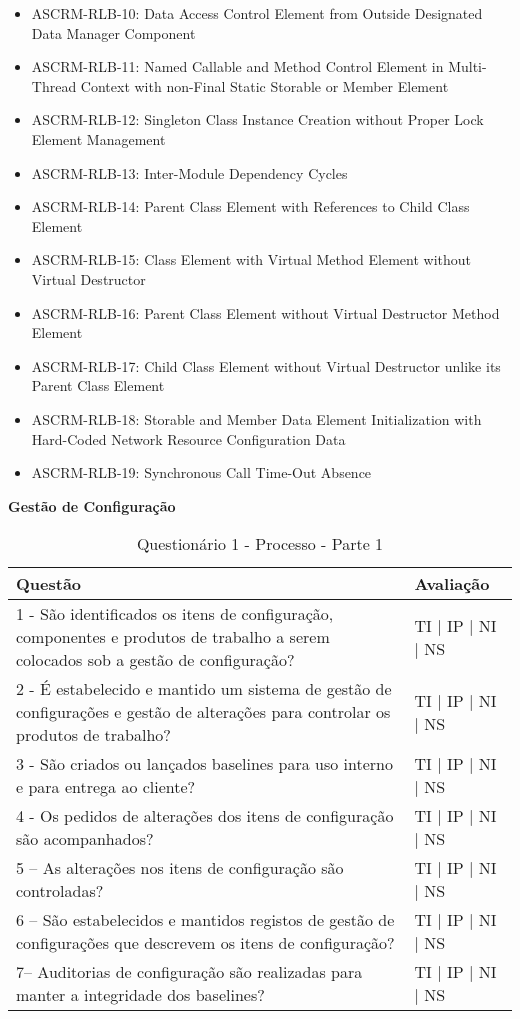 \documentclass[openany,10pt,a4paper]{article}
\begin{document}
\begin{appendix}
\begin{itemize}
	\item ASCRM-RLB-10: Data Access Control Element from Outside Designated Data Manager Component
	\item ASCRM-RLB-11: Named Callable and Method Control Element in Multi-Thread Context with non-Final Static Storable or Member Element
	\item ASCRM-RLB-12: Singleton Class Instance Creation without Proper Lock Element Management
	\item ASCRM-RLB-13: Inter-Module Dependency Cycles
	\item ASCRM-RLB-14: Parent Class Element with References to Child Class Element
	\item ASCRM-RLB-15: Class Element with Virtual Method Element without Virtual Destructor
	\item ASCRM-RLB-16: Parent Class Element without Virtual Destructor Method Element
	\item ASCRM-RLB-17: Child Class Element without Virtual Destructor unlike its Parent Class Element
	\item ASCRM-RLB-18: Storable and Member Data Element Initialization with Hard-Coded Network Resource Configuration Data
	\item ASCRM-RLB-19: Synchronous Call Time-Out Absence
\end{itemize}




\begin{table}[h]
\textbf{Gestão de Configuração}
	\centering
	\caption{Questionário 1 - Processo - Parte 1}
	\begin{tabular}{p{3.5in}p{2in}}		
		\toprule
		\textbf{Questão}  & \textbf{Avaliação}\\ 
		\midrule
		1 - São identificados os itens de configuração, componentes e produtos de trabalho a serem 
colocados sob a gestão de configuração?
 & TI | IP | NI | NS \\
        \midrule
		2 - É estabelecido e mantido um sistema de gestão de configurações e gestão de alterações para 
controlar os produtos de trabalho?
 & TI | IP | NI | NS \\
		\midrule
		3 -  São criados ou lançados baselines para uso interno e para entrega ao cliente?
 & TI | IP | NI | NS \\
		\midrule
		4 - Os pedidos de alterações dos itens de configuração são acompanhados?
 & TI | IP | NI | NS \\
		\midrule
		5 – As alterações nos itens de configuração são controladas?
  & TI | IP | NI | NS \\
		\midrule
		6 – São estabelecidos e mantidos registos de gestão de configurações que descrevem os itens 
de configuração?
 & TI | IP | NI | NS \\
		\midrule
		7– Auditorias de configuração são realizadas para manter a integridade dos baselines?
 & TI | IP | NI | NS \\
		\bottomrule
	\end{tabular} 
	\label{tab:tabela1}
\end{table}


\end{appendix}
\end{document}
